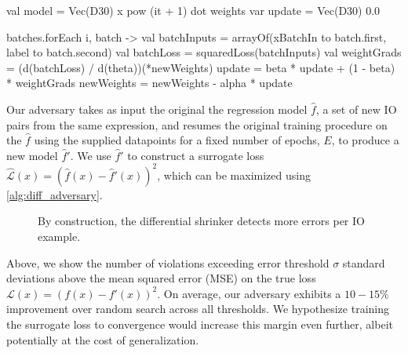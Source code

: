 \begin{kotlinlisting}
val model = Vec(D30) { x pow (it + 1) } dot weights
var update = Vec(D30) { 0.0 }

batches.forEach { i, batch ->
  val batchInputs = arrayOf(xBatchIn to batch.first, label to batch.second)
  val batchLoss = squaredLoss(batchInputs)
  val weightGrads = (d(batchLoss) / d(theta))(*newWeights)
  update = beta * update + (1 - beta) * weightGrads
  newWeights = newWeights - alpha * update
}
\end{kotlinlisting}

Our adversary takes as input the original the regression model $\hat{f}$, a set of new IO pairs from the same expression, and resumes the original training procedure on the $\hat{f}$ using the supplied datapoints for a fixed number of epochs, $E$, to produce a new model $\hat{f}'$. We use $\hat{f}'$ to construct a surrogate loss $\hat{\mathcal{L}}(x) = (\hat{f}(x) - \hat{f}'(x))^2$, which can be maximized using \autoref{alg:diff_adversary}.

\begin{figure}[H]
\caption{By construction, the differential shrinker detects more errors per IO example.}
\label{fig:pbt_comparison}
\end{figure}

Above, we show the number of violations exceeding error threshold $\sigma$ standard deviations above the mean squared error (MSE) on the true loss $\mathcal{L}(x) = (f(x) - f'(x))^2$. On average, our adversary exhibits a $10-15\%$ improvement over random search across all thresholds. We hypothesize training the surrogate loss to convergence would increase this margin even further, albeit potentially at the cost of generalization.


